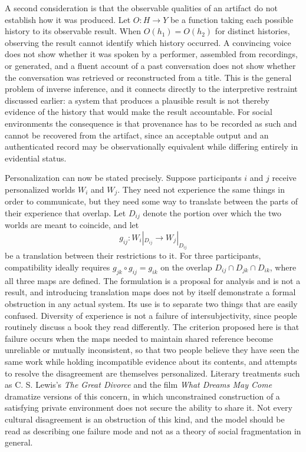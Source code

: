 \documentclass[11pt]{article}
\theoremstyle{remark}
\newcommand{\Hh}{H}
\begin{document}
A second consideration is that the observable qualities of an artifact do not establish how it was produced. Let $O : \Hh \rightarrow Y$ be a function taking each possible history to its observable result. When $O(h_1)=O(h_2)$ for distinct histories, observing the result cannot identify which history occurred. A convincing voice does not show whether it was spoken by a performer, assembled from recordings, or generated, and a fluent account of a past conversation does not show whether the conversation was retrieved or reconstructed from a title. This is the general problem of inverse inference, and it connects directly to the interpretive restraint discussed earlier: a system that produces a plausible result is not thereby evidence of the history that would make the result accountable. For social environments the consequence is that provenance has to be recorded as such and cannot be recovered from the artifact, since an acceptable output and an authenticated record may be observationally equivalent while differing entirely in evidential status.

Personalization can now be stated precisely. Suppose participants $i$ and $j$ receive personalized worlds $W_i$ and $W_j$. They need not experience the same things in order to communicate, but they need some way to translate between the parts of their experience that overlap. Let $D_{ij}$ denote the portion over which the two worlds are meant to coincide, and let
\[
g_{ij} : W_i|_{D_{ij}} \longrightarrow W_j|_{D_{ij}}
\]
be a translation between their restrictions to it. For three participants, compatibility ideally requires $g_{jk}\circ g_{ij}=g_{ik}$ on the overlap $D_{ij}\cap D_{jk}\cap D_{ik}$, where all three maps are defined. The formulation is a proposal for analysis and is not a result, and introducing translation maps does not by itself demonstrate a formal obstruction in any actual system. Its use is to separate two things that are easily confused. Diversity of experience is not a failure of intersubjectivity, since people routinely discuss a book they read differently. The criterion proposed here is that failure occurs when the maps needed to maintain shared reference become unreliable or mutually inconsistent, so that two people believe they have seen the same work while holding incompatible evidence about its contents, and attempts to resolve the disagreement are themselves personalized. Literary treatments such as C. S. Lewis's \emph{The Great Divorce} and the film \emph{What Dreams May Come} dramatize versions of this concern, in which unconstrained construction of a satisfying private environment does not secure the ability to share it. Not every cultural disagreement is an obstruction of this kind, and the model should be read as describing one failure mode and not as a theory of social fragmentation in general.
\end{document}
